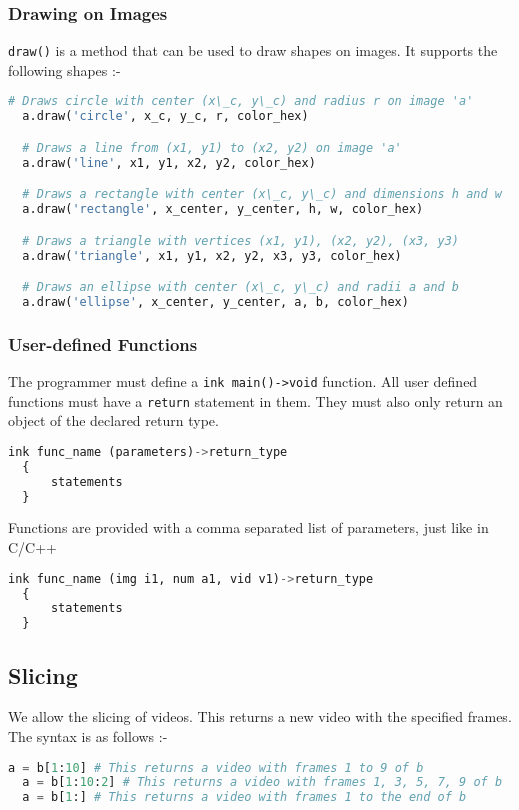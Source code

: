 \documentclass[a4paper, 11pt]{article}
\begin{document}
          \subsubsection{Drawing on Images}
             \texttt{draw()} is a method that can be used to draw shapes on images. It supports the following shapes :-
             \begin{lstlisting}[language=Python]
  # Draws circle with center (x\_c, y\_c) and radius r on image 'a'
  a.draw('circle', x_c, y_c, r, color_hex)

  # Draws a line from (x1, y1) to (x2, y2) on image 'a'
  a.draw('line', x1, y1, x2, y2, color_hex)

  # Draws a rectangle with center (x\_c, y\_c) and dimensions h and w
  a.draw('rectangle', x_center, y_center, h, w, color_hex)

  # Draws a triangle with vertices (x1, y1), (x2, y2), (x3, y3)
  a.draw('triangle', x1, y1, x2, y2, x3, y3, color_hex)

  # Draws an ellipse with center (x\_c, y\_c) and radii a and b
  a.draw('ellipse', x_center, y_center, a, b, color_hex)\end{lstlisting}

          \subsubsection{User-defined Functions}
          The programmer must define a \texttt{ink main()->void} function.
          All user defined functions must have a \texttt{return} statement in them. They must also only return an object of the declared return type.
            \begin{lstlisting}[language=Python]
  ink func_name (parameters)->return_type
  {
      statements
  }\end{lstlisting}
Functions are provided with a comma separated list of parameters, just like in C/C++
  \begin{lstlisting}[language=Python]
  ink func_name (img i1, num a1, vid v1)->return_type
  {
      statements
  }
  \end{lstlisting}

    \subsection{Slicing}
  We allow the slicing of videos. This returns a new video with the specified frames. The syntax is as follows :-
  \begin{lstlisting}[language=Python]
  a = b[1:10] # This returns a video with frames 1 to 9 of b
  a = b[1:10:2] # This returns a video with frames 1, 3, 5, 7, 9 of b
  a = b[1:] # This returns a video with frames 1 to the end of b\end{lstlisting}
\end{document}
